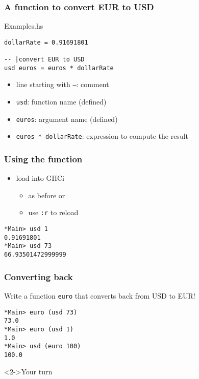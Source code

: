 \documentclass{beamer}
\begin{document}
\begin{frame}[fragile]
  \frametitle{A function to convert EUR to USD}
\begin{block}{Examples.hs}
\begin{verbatim}
dollarRate = 0.91691801

-- |convert EUR to USD
usd euros = euros * dollarRate
\end{verbatim}
  \end{block}
  \begin{itemize}
  \item line starting with \texttt{--}: comment
  \item \texttt{usd}: function name (defined)
  \item \texttt{euros}:  argument name (defined)
  \item \texttt{euros * dollarRate}: expression to compute the result
  \end{itemize}
\end{frame}
\begin{frame}[fragile]
  \frametitle{Using the function}
  \begin{itemize}
  \item load into GHCi
    \begin{itemize}
    \item as before or
    \item use \texttt{:r} to reload
    \end{itemize}
  \end{itemize}
\begin{verbatim}
*Main> usd 1
0.91691801
*Main> usd 73
66.93501472999999
\end{verbatim}
\end{frame}
\begin{frame}[fragile]
  \frametitle{Converting back}
Write a function \texttt{euro} that converts back from USD to EUR!
\begin{verbatim}
*Main> euro (usd 73)
73.0
*Main> euro (usd 1)
1.0
*Main> usd (euro 100)
100.0
\end{verbatim}
\begin{alertblock}<2->{Your turn}

\end{alertblock}
\end{frame}
\end{document}
